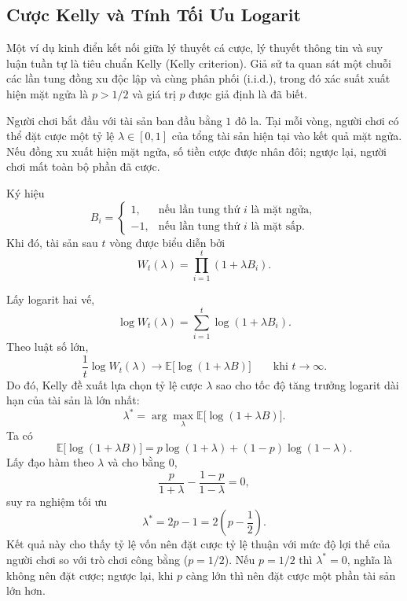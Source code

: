 \subsection{Cược Kelly và Tính Tối Ưu Logarit}

Một ví dụ kinh điển kết nối giữa lý thuyết cá cược, lý thuyết thông tin và suy luận tuần tự là tiêu chuẩn Kelly (Kelly criterion). Giả sử ta quan sát một chuỗi các lần tung đồng xu độc lập và cùng phân phối (i.i.d.), trong đó xác suất xuất hiện mặt ngửa là $p > 1/2$ và giá trị $p$ được giả định là đã biết.

Người chơi bắt đầu với tài sản ban đầu bằng $1$ đô la. Tại mỗi vòng, người chơi có thể đặt cược một tỷ lệ $\lambda \in [0,1]$ của tổng tài sản hiện tại vào kết quả mặt ngửa. Nếu đồng xu xuất hiện mặt ngửa, số tiền cược được nhân đôi; ngược lại, người chơi mất toàn bộ phần đã cược.

Ký hiệu
\begin{equation}
B_i =
\begin{cases}
1, & \text{nếu lần tung thứ } i \text{ là mặt ngửa},\\
-1, & \text{nếu lần tung thứ } i \text{ là mặt sấp}.
\end{cases}
\end{equation} Khi đó, tài sản sau $t$ vòng được biểu diễn bởi
\begin{equation}
W_t(\lambda)
=
\prod_{i=1}^{t}
\left(1+\lambda B_i\right).
\end{equation}

Lấy logarit hai vế,
\begin{equation}
\log W_t(\lambda)
=
\sum_{i=1}^{t}
\log\left(1+\lambda B_i\right).
\end{equation}
Theo luật số lớn,
\begin{equation}
\frac{1}{t}\log W_t(\lambda)
\to
\mathbb{E}
\big[
\log(1+\lambda B)
\big]
\qquad
\text{khi }
t\to\infty.
\end{equation}
Do đó, Kelly đề xuất lựa chọn tỷ lệ cược $\lambda$ sao cho tốc độ tăng trưởng logarit dài hạn của tài sản là lớn nhất:
\begin{equation}
\lambda^*
=
\arg\max_{\lambda}
\mathbb{E}
\big[
\log(1+\lambda B)
\big].
\end{equation} Ta có
\begin{equation}
\mathbb{E}
\big[
\log(1+\lambda B)
\big]
=
p\log(1+\lambda)
+
(1-p)\log(1-\lambda).
\end{equation}
Lấy đạo hàm theo $\lambda$ và cho bằng $0$,
\begin{equation}
\frac{p}{1+\lambda}
-
\frac{1-p}{1-\lambda}
=
0,
\end{equation}
suy ra nghiệm tối ưu
\begin{equation}
\lambda^*
=
2p-1
=
2\left(p-\frac12\right).
\end{equation}
Kết quả này cho thấy tỷ lệ vốn nên đặt cược tỷ lệ thuận với mức độ lợi thế của người chơi so với trò chơi công bằng ($p=1/2$). Nếu $p=1/2$ thì $\lambda^*=0$, nghĩa là không nên đặt cược; ngược lại, khi $p$ càng lớn thì nên đặt cược một phần tài sản lớn hơn.

